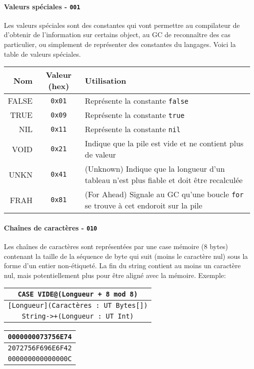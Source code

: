 \documentclass{article}
\begin{document}
\paragraph{Valeurs spéciales - \texttt{001}}
Les valeurs spéciales sont des constantes qui vont permettre au compilateur de d'obtenir de l'information sur certains object, au GC de reconnaître des cas particulier, ou simplement de représenter des constantes du langages. Voici la table de valeurs spéciales.
\begin{center}
  \begin{tabular}{r|c|p{12cm}}
    Nom & Valeur (hex) & Utilisation\\
    \hline
    FALSE & \texttt{0x01} & Représente la constante {\lstset{style=lua}\lstinline$false$}\\
    TRUE  & \texttt{0x09} & Représente la constante {\lstset{style=lua}\lstinline$true$}\\
    NIL   & \texttt{0x11} & Représente la constante {\lstset{style=lua}\lstinline$nil$}\\
    VOID  & \texttt{0x21} & Indique que la pile est vide et ne contient plus de valeur\\
    UNKN  & \texttt{0x41} & (Unknown) Indique que la longueur d'un tableau n'est plus fiable et doit être recalculée\\
    FRAH  & \texttt{0x81} & (For Ahead) Signale au GC qu'une boucle {\lstset{style=lua}\lstinline$for$} se trouve à cet endoroit sur la pile\\
  \end{tabular}
\end{center}
\paragraph{Chaînes de caractères - \texttt{010}}
Les chaînes de caractères sont représentées par une case mémoire (8 bytes) contenant la taille de la séquence de byte qui suit (moins le caractère nul) sous la forme d'un entier non-étiqueté. La fin du string contient au moins un caractère nul, mais potentiellement plus pour être aligné avec la mémoire. Exemple:
\begin{center}
  \begin{tabular}{|c|}
    \hline
    \texttt{CASE VIDE@(Longueur + 8 mod 8)}\\
    \hline
    \texttt{[Longueur](Caractères : UT Bytes[])}\\
    \hline
    \texttt{String->+(Longueur : UT Int)}\\
    \hline
  \end{tabular}
  \hspace{2cm}
  \begin{tabular}{|c|}
    \hline
    \texttt{0000000073756E74}\\
    \hline
    \texttt{2072756F696E6F42}\\
    \hline
    \texttt{000000000000000C}\\
    \hline
  \end{tabular}
\end{center}
\end{document}
